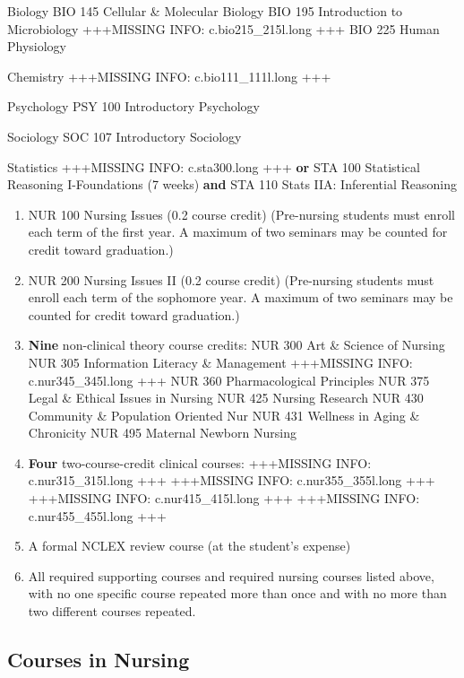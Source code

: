\documentclass[
  letterpaper,
]{scrbook}
\begin{document}
Biology BIO 145 Cellular \& Molecular Biology BIO 195 Introduction to
Microbiology +++MISSING INFO: c.bio215\_215l.long +++ BIO 225 Human
Physiology

Chemistry +++MISSING INFO: c.bio111\_111l.long +++

Psychology PSY 100 Introductory Psychology

Sociology SOC 107 Introductory Sociology

Statistics +++MISSING INFO: c.sta300.long +++ \textbf{or} STA 100
Statistical Reasoning I-Foundations (7 weeks) \textbf{and} STA 110 Stats
IIA: Inferential Reasoning

\begin{enumerate}
\def\labelenumi{\arabic{enumi}.}
\setcounter{enumi}{2}
\item
  NUR 100 Nursing Issues (0.2 course credit) (Pre-nursing students must
  enroll each term of the first year. A maximum of two seminars may be
  counted for credit toward graduation.)
\item
  NUR 200 Nursing Issues II (0.2 course credit) (Pre-nursing students
  must enroll each term of the sophomore year. A maximum of two seminars
  may be counted for credit toward graduation.)
\item
  \textbf{Nine} non-clinical theory course credits: NUR 300 Art \&
  Science of Nursing NUR 305 Information Literacy \& Management
  +++MISSING INFO: c.nur345\_345l.long +++ NUR 360 Pharmacological
  Principles NUR 375 Legal \& Ethical Issues in Nursing NUR 425 Nursing
  Research NUR 430 Community \& Population Oriented Nur NUR 431 Wellness
  in Aging \& Chronicity NUR 495 Maternal Newborn Nursing
\item
  \textbf{Four} two-course-credit clinical courses: +++MISSING INFO:
  c.nur315\_315l.long +++ +++MISSING INFO: c.nur355\_355l.long +++
  +++MISSING INFO: c.nur415\_415l.long +++ +++MISSING INFO:
  c.nur455\_455l.long +++
\item
  A formal NCLEX review course (at the student's expense)
\item
  All required supporting courses and required nursing courses listed
  above, with no one specific course repeated more than once and with no
  more than two different courses repeated.
\end{enumerate}

\subsection{Courses in Nursing}\label{courses-in-nursing}
\end{document}
